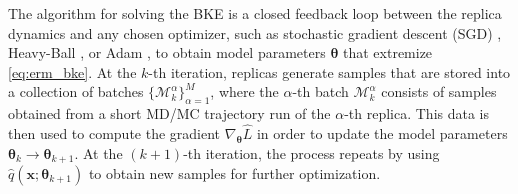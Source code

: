 \documentclass{article}
\numberwithin{equation}{section}
\def\*#1{\mathbf{#1}}
\theoremstyle{definition}
\theoremstyle{remark}
\def\thetab{\boldsymbol{\theta}}
\begin{document}
The algorithm for solving the BKE is a closed feedback loop between the replica dynamics and any chosen optimizer, such as stochastic gradient descent (SGD) \cite{robbins1951stochastic}, Heavy-Ball \cite{polyak1964some}, or Adam \cite{kingma2014adam}, to obtain model parameters $\thetab$ that extremize \cref{eq:erm_bke}.
At the $k$-th iteration, replicas generate samples that are stored into a collection of batches $ \{ \mathcal{M}^\alpha_k \}_{\alpha=1}^M$, where the $\alpha$-th batch $\mathcal{M}^\alpha_k$ consists of samples obtained from a short MD/MC trajectory run of the $\alpha$-th replica. 
This data is then used to compute the gradient $\nabla_{\thetab} \hat{L}$ in order to update the model parameters $\thetab_{k} \to \thetab_{k+1}$. 
At the $(k+1)$-th iteration, the process repeats by using $ \hat{q}( \* x ; \thetab_{k+1} ) $ to obtain new samples for further optimization.
\end{document}
